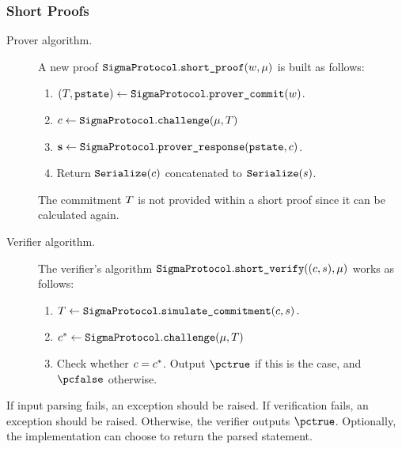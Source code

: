 \documentclass[11pt]{article}
\begin{document}
\subsubsection{Short Proofs}\label{sec:shortproof}
\begin{description}
\item[Prover algorithm.]
A new proof $\texttt{SigmaProtocol}.\texttt{short\_proof}(w, \mu)$ is built as follows:
\begin{enumerate}
  \item
     $(T,\texttt{pstate})\gets\texttt{SigmaProtocol}.\texttt{prover\_commit}(w)$.
  \item
   $c \gets \texttt{SigmaProtocol}.\texttt{challenge}(\mu,  T)$
  \item
     $\mathbf {s}\gets\texttt{SigmaProtocol}.\texttt{prover\_response}(\texttt{pstate},c)$.
  \item
  Return $\texttt{Serialize}(c)$ concatenated to $\texttt{Serialize}(s)$.
\end{enumerate}
The commitment $T$ is not provided within a short proof since it can be calculated again.
\item[Verifier algorithm.] The verifier's algorithm $\texttt{SigmaProtocol}.\texttt{short\_verify}( (c, s), \mu)$ works as follows:
\begin{enumerate}
  \item $T \gets \texttt{SigmaProtocol}.\texttt{simulate\_commitment}(c, s)\,.$
  \item $c^* \gets \texttt{SigmaProtocol}.\texttt{challenge}(\mu, T)$
  \item
  Check whether $c=c^*$.
  Output $\accept$ if this is the case, and $\reject$ otherwise.
\end{enumerate}
\end{description}


If input parsing fails, an exception should be raised.
If verification fails, an exception should be raised.
Otherwise, the verifier outputs $\pctrue$. Optionally, the implementation can choose to return the parsed statement.
\end{document}
